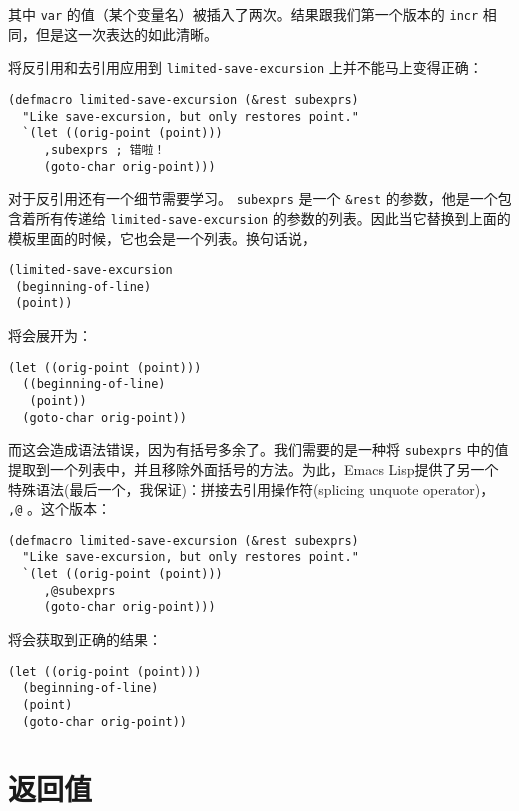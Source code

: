 其中 \texttt{var} 的值（某个变量名）被插入了两次。结果跟我们第一个版本的 \texttt{incr} 相同，但是这一次表达的如此清晰。

将反引用和去引用应用到 \texttt{limited-save-excursion} 上并不能马上变得正确：

\begin{verbatim}
(defmacro limited-save-excursion (&rest subexprs)
  "Like save-excursion, but only restores point."
  `(let ((orig-point (point)))
     ,subexprs ; 错啦！
     (goto-char orig-point)))
\end{verbatim}

对于反引用还有一个细节需要学习。 \texttt{subexprs} 是一个 \texttt{&rest} 的参数，他是一个包含着所有传递给 \texttt{limited-save-excursion} 的参数的列表。因此当它替换到上面的模板里面的时候，它也会是一个列表。换句话说，

\begin{verbatim}
(limited-save-excursion
 (beginning-of-line)
 (point))
\end{verbatim}

将会展开为：

\begin{verbatim}
(let ((orig-point (point)))
  ((beginning-of-line)
   (point))
  (goto-char orig-point))
\end{verbatim}

而这会造成语法错误，因为有括号多余了。我们需要的是一种将 \texttt{subexprs} 中的值提取到一个列表中，并且移除外面括号的方法。为此，Emacs Lisp提供了另一个特殊语法(最后一个，我保证)：拼接去引用操作符(splicing unquote operator)， \texttt{,@} 。这个版本：

\begin{verbatim}
(defmacro limited-save-excursion (&rest subexprs)
  "Like save-excursion, but only restores point."
  `(let ((orig-point (point)))
     ,@subexprs
     (goto-char orig-point)))
\end{verbatim}

将会获取到正确的结果：

\begin{verbatim}
(let ((orig-point (point)))
  (beginning-of-line)
  (point)
  (goto-char orig-point))
\end{verbatim}

\section{返回值}
\label{section:08-Return-Value}

